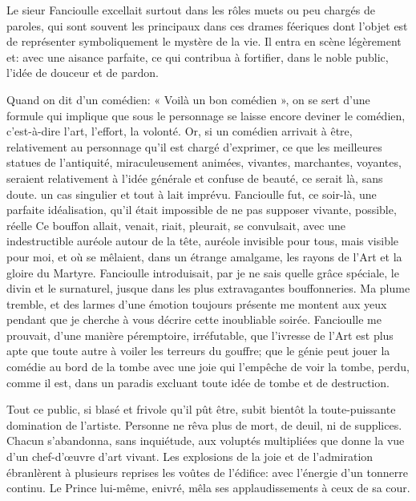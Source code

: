 Le sieur Fancioulle excellait surtout dans les rôles muets ou peu
chargés de paroles, qui sont souvent les principaux dans ces drames
féeriques dont l’objet est de représenter
symboliquement le mystère de la vie. Il entra en scène légèrement et:
avec une aisance parfaite, ce qui contribua à fortifier, dans le noble
public, l’idée de douceur et de pardon.

Quand on dit d’un comédien: « Voilà un bon comédien »,
on se sert d’une formule qui implique que sous le
personnage se laisse encore deviner le comédien,
c’est{}-à{}-dire l’art,
l’effort, la volonté. Or, si un comédien arrivait à
être, relativement au personnage qu’il est chargé
d’exprimer, ce que les meilleures statues de
l’antiquité, miraculeusement animées, vivantes,
marchantes, voyantes, seraient relativement à l’idée
générale et confuse de beauté, ce serait là, sans doute. un cas
singulier et tout à lait imprévu. Fancioulle fut, ce soir{}-là, une
parfaite idéalisation, qu’il était impossible de ne
pas supposer vivante, possible, réelle Ce bouffon allait, venait,
riait, pleurait, se convulsait, avec une indestructible auréole autour
de la tête, auréole invisible pour tous, mais visible pour moi, et où
se mêlaient, dans un étrange amalgame, les rayons de
l’Art et la gloire du Martyre. Fancioulle
introduisait, par je ne sais quelle grâce spéciale, le divin et le
surnaturel, jusque dans les plus extravagantes bouffonneries. Ma plume
tremble, et des larmes d’une émotion toujours présente
me montent aux yeux pendant que je cherche à vous décrire cette
inoubliable soirée. Fancioulle me prouvait, d’une
manière péremptoire, irréfutable, que l’ivresse de
l’Art est plus apte que toute autre à voiler les
terreurs du gouffre; que le génie peut jouer la comédie au bord de la
tombe avec une joie qui l’empêche de voir la tombe,
perdu, comme il est, dans un paradis excluant toute idée de tombe et de
destruction.

Tout ce public, si blasé et frivole qu’il pût être,
subit bientôt la toute{}-puissante domination de
l’artiste. Personne ne rêva plus de mort, de deuil, ni
de supplices. Chacun s’abandonna, sans inquiétude, aux
voluptés multipliées que donne la vue d’un
chef{}-d’\oe uvre d’art vivant. Les
explosions de la joie et de l’admiration ébranlèrent à
plusieurs reprises les voûtes de l’édifice: avec
l’énergie d’un tonnerre continu. Le
Prince lui{}-même, enivré, mêla ses applaudissements à ceux de sa cour.

